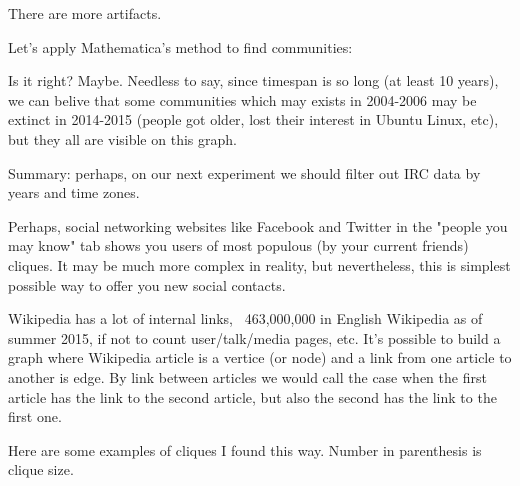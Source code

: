 \begin{figure}[H]
\centering
{}
\end{figure}

There are more artifacts.

Let's apply Mathematica's method to find communities:

\begin{figure}[H]
\centering
{}
\end{figure}

Is it right? Maybe. Needless to say, since timespan is so long (at least 10 years), we can belive that some communities which may exists in 2004-2006 may be
extinct in 2014-2015 (people got older, lost their interest in Ubuntu Linux, etc), but they all are visible on this graph.

Summary: perhaps, on our next experiment we should filter out IRC data by years and time zones.


Perhaps, social networking websites like Facebook and Twitter in the "people you may know" tab shows you users of most populous (by your current friends) cliques.
It may be much more complex in reality, but nevertheless, this is simplest possible way to offer you new social contacts.


Wikipedia has a lot of internal links, ~463,000,000 in English Wikipedia as of summer 2015, if not to count user/talk/media pages, etc.
It's possible to build a graph where Wikipedia article is a vertice (or node) and a link from one article to another is edge.
By link between articles we would call the case when the first article has the link to the second article, but also the second has the link to the first one.

Here are some examples of cliques I found this way. Number in parenthesis is clique size.

